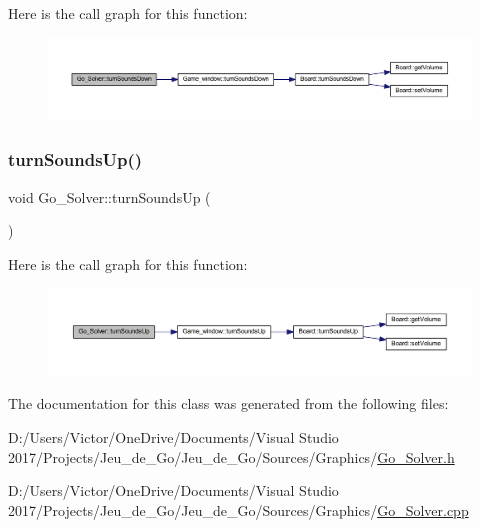 Here is the call graph for this function\+:
\nopagebreak
\begin{figure}[H]
\begin{center}
\leavevmode
\includegraphics[width=350pt]{class_go___solver_a1d7d0fad019f2d33caebb6cfe11d1f42_cgraph}
\end{center}
\end{figure}
\mbox{\label{class_go___solver_a461b1fecf636b55d6b9f31b0035366c3}} 
\subsubsection{\texorpdfstring{turn\+Sounds\+Up()}{turnSoundsUp()}}
{\footnotesize\ttfamily void Go\+\_\+\+Solver\+::turn\+Sounds\+Up (\begin{DoxyParamCaption}{ }\end{DoxyParamCaption})}

Here is the call graph for this function\+:
\nopagebreak
\begin{figure}[H]
\begin{center}
\leavevmode
\includegraphics[width=350pt]{class_go___solver_a461b1fecf636b55d6b9f31b0035366c3_cgraph}
\end{center}
\end{figure}


The documentation for this class was generated from the following files\+:\begin{DoxyCompactItemize}
\item 
D\+:/\+Users/\+Victor/\+One\+Drive/\+Documents/\+Visual Studio 2017/\+Projects/\+Jeu\+\_\+de\+\_\+\+Go/\+Jeu\+\_\+de\+\_\+\+Go/\+Sources/\+Graphics/\hyperlink{_go___solver_8h}{Go\+\_\+\+Solver.\+h}\item 
D\+:/\+Users/\+Victor/\+One\+Drive/\+Documents/\+Visual Studio 2017/\+Projects/\+Jeu\+\_\+de\+\_\+\+Go/\+Jeu\+\_\+de\+\_\+\+Go/\+Sources/\+Graphics/\hyperlink{_go___solver_8cpp}{Go\+\_\+\+Solver.\+cpp}\end{DoxyCompactItemize}
